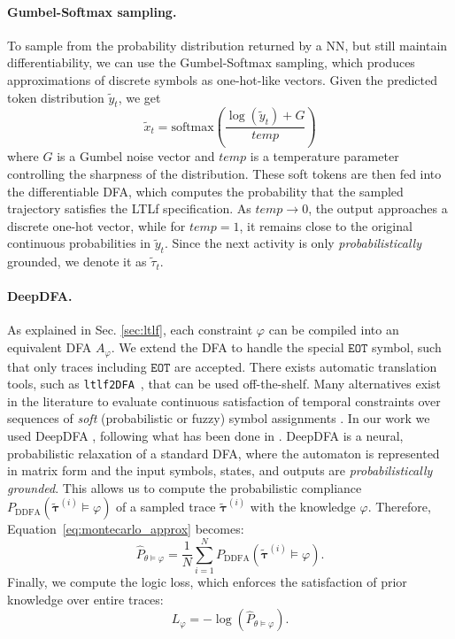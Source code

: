 \paragraph{Gumbel-Softmax sampling.} To sample from the probability distribution returned by a NN, but still maintain differentiability, we can use the Gumbel-Softmax sampling, which produces approximations of discrete symbols as one-hot-like vectors. Given the predicted token distribution $\tilde{y}_t$, we get 
\begin{equation}
\tilde{x}_t = \text{softmax} \left( \frac{\log (\tilde{y}_t) +G}{temp} \right)
\end{equation}
%
\noindent
where $G$ is a Gumbel noise vector and $temp$ is a temperature parameter controlling the sharpness of the distribution. These soft tokens are then fed into the differentiable DFA, which computes the probability that the sampled trajectory satisfies the LTLf specification. As $temp \rightarrow 0$, the output approaches a discrete one-hot vector, while for $temp = 1$, it remains close to the original continuous probabilities in $\tilde{y}_t$. Since the next activity is only \emph{probabilistically} grounded, we denote it as $\tilde{\tau}_t$.

\paragraph{DeepDFA.}
As explained in Sec. \ref{sec:ltlf}, each \ltlf constraint $\varphi$ can be compiled into an equivalent DFA $A_\varphi$. We extend the DFA to handle the special $\texttt{EOT}$ symbol, such that only traces including $\texttt{EOT}$ are accepted. There exists automatic translation tools, such as \texttt{ltlf2DFA}~\cite{fuggitti-ltlf2dfa}, that can be used off-the-shelf.
Many alternatives exist in the literature to evaluate continuous satisfaction of temporal constraints over sequences of \textit{soft} (probabilistic or fuzzy) symbol assignments \cite{umili_kr23,deepdfa_ecai2024,DonadelloFIMM25,NesyA}. In our work we used DeepDFA \cite{deepdfa_ecai2024}, following what has been done in \cite{UmiliPMAI24,mezini2025neuro}. DeepDFA is a neural, probabilistic relaxation of a standard DFA, where the automaton is represented in matrix form and the input symbols, states, and outputs are \textit{probabilistically grounded}. This allows us to compute the probabilistic compliance $P_{\mathrm{DDFA}}(\tilde{\boldsymbol{\tau}}^{(i)} \vDash \varphi)$ of a sampled trace $\tilde{\boldsymbol{\tau}}^{(i)}$ with the knowledge $\varphi$. Therefore, Equation~\ref{eq:montecarlo_approx} becomes:
    \begin{equation} \label{eq:montecarlo_approx_ddfa}
    \hat{P}_{\theta \vDash \varphi} = \frac{1}{N} \sum_{i=1}^N P_{\mathrm{DDFA}}(\tilde{\boldsymbol{\tau}}^{(i)} \vDash \varphi).
\end{equation}
%
\noindent
Finally, we compute the logic loss, which enforces the satisfaction of prior knowledge over entire traces:
\begin{equation}
L_\varphi = - \log \left( \hat{P}_{\theta \vDash \varphi} \right).
\end{equation}





